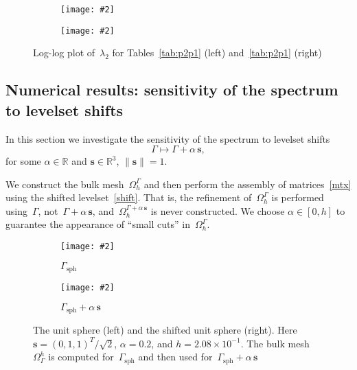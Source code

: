 \documentclass[12pt]{article}
\newcommand{\includegraphicsw}[2][1.]{\texttt{[image: \#2]}}
\newcommand{\vect}[1]{\boldsymbol{\mathbf{#1}}}
\newcommand{\sphere}{{\Gamma_{\text{sph}}}}
\begin{document}
\vfill
\begin{figure}[h]
	\centering\small
	\begin{subfigure}{.49\linewidth}
		\centering
		\includegraphicsw{sphere_2_P2P1.png}
	\end{subfigure}%
	\hfill
	\begin{subfigure}{.49\linewidth}
		\centering
		\includegraphicsw{torus_P2P1.png}
	\end{subfigure}
	\caption{Log-log plot of~$\lambda_2$ for Tables~\ref{tab:p2p1} (left) and~\ref{tab:p2p1} (right)}
\end{figure}
\vfill

\clearpage

\subsection{Numerical results: sensitivity of the spectrum to levelset shifts}

In this section we investigate the sensitivity of the spectrum to levelset shifts
\begin{equation}\label{shift}
	\Gamma \mapsto \Gamma + \alpha\,\vect s,
\end{equation}
for some $\alpha \in \mathbb R$ and $\vect s \in \mathbb R^3$, $\|\vect s\| = 1$. 

We construct the bulk mesh~$\Omega_h^\Gamma$ and then perform the assembly of matrices~\eqref{mtx} using the shifted levelset~\eqref{shift}. That is, the refinement of~$\Omega_h^\Gamma$ is performed using~$\Gamma$, not~$\Gamma + \alpha\,\vect s$, and~$\Omega_h^{\Gamma + \alpha\,\vect s}$ is never constructed. We choose $\alpha \in [0, h]$ to guarantee the appearance of ``small cuts'' in~$\Omega_h^\Gamma$.

\begin{figure}[h]
	\centering
	\begin{subfigure}{.5\linewidth}
		\centering
		\includegraphicsw[.7]{{shift_0.0.cropped}.png}
		\caption{$\sphere$}
	\end{subfigure}%
	\begin{subfigure}{.5\linewidth}
		\centering
		\includegraphicsw[.7]{{shift_0.2.cropped}.png}
		\caption{$\sphere + \alpha\,\vect s$}
	\end{subfigure}%
	\caption{The unit sphere (left) and the shifted unit sphere (right). Here $\vect s = (0, 1, 1)^T/\sqrt{2}$, $\alpha = 0.2$, and $h = 2.08\times10^{-1}$. The bulk mesh~$\Omega_\Gamma^h$ is computed for~$\sphere$ and then used for~$\sphere + \alpha\,\vect s$}
	\label{fig:shift}		
\end{figure}
\end{document}
